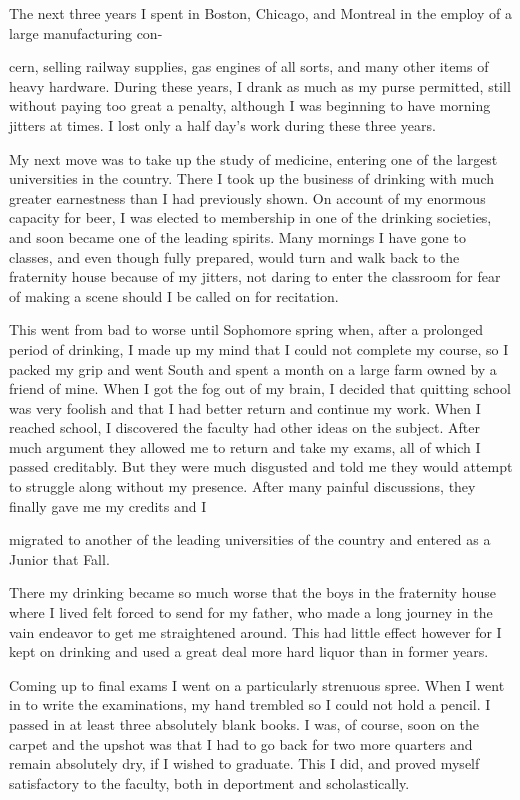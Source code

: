 \begin{biblechapter}
The next three years I spent in Boston, Chicago, and Montreal in the employ of a large manufacturing con-

cern, selling railway supplies, gas engines of all sorts, and many other items of heavy hardware. During these years, I drank as much as my purse permitted, still without paying too great a penalty, although I was beginning to have morning jitters at times. I lost only a half day’s work during these three years.

My next move was to take up the study of medicine, entering one of the largest universities in the country. There I took up the business of drinking with much greater earnestness than I had previously shown. On account of my enormous capacity for beer, I was elected to membership in one of the drinking societies, and soon became one of the leading spirits. Many mornings I have gone to classes, and even though fully prepared, would turn and walk back to the fraternity house because of my jitters, not daring to enter the classroom for fear of making a scene should I be called on for recitation.

This went from bad to worse until Sophomore spring when, after a prolonged period of drinking, I made up my mind that I could not complete my course, so I packed my grip and went South and spent a month on a large farm owned by a friend of mine. When I got the fog out of my brain, I decided that quitting school was very foolish and that I had better return and continue my work. When I reached school, I discovered the faculty had other ideas on the subject. After much argument they allowed me to return and take my exams, all of which I passed creditably. But they were much disgusted and told me they would attempt to struggle along without my presence. After many painful discussions, they finally gave me my credits and I

migrated to another of the leading universities of the country and entered as a Junior that Fall.

There my drinking became so much worse that the boys in the fraternity house where I lived felt forced to send for my father, who made a long journey in the vain endeavor to get me straightened around. This had little effect however for I kept on drinking and used a great deal more hard liquor than in former years.

Coming up to final exams I went on a particularly strenuous spree. When I went in to write the examinations, my hand trembled so I could not hold a pencil. I passed in at least three absolutely blank books. I was, of course, soon on the carpet and the upshot was that I had to go back for two more quarters and remain absolutely dry, if I wished to graduate. This I did, and proved myself satisfactory to the faculty, both in deportment and scholastically.


\end{biblechapter}
